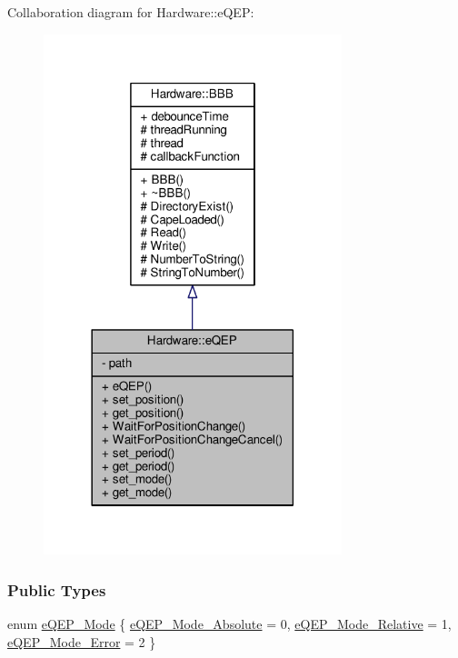 Collaboration diagram for Hardware\+:\+:e\+Q\+E\+P\+:
\nopagebreak
\begin{figure}[H]
\begin{center}
\leavevmode
\includegraphics[width=246pt]{class_hardware_1_1e_q_e_p__coll__graph}
\end{center}
\end{figure}
\subsubsection*{Public Types}
\begin{DoxyCompactItemize}
\item 
enum \hyperlink{class_hardware_1_1e_q_e_p_a3f97f26c64d49d6f2643a257b7249070}{e\+Q\+E\+P\+\_\+\+Mode} \{ \hyperlink{class_hardware_1_1e_q_e_p_a3f97f26c64d49d6f2643a257b7249070a5e916ce9f21af5bd9c5c63609630df7e}{e\+Q\+E\+P\+\_\+\+Mode\+\_\+\+Absolute} = 0, 
\hyperlink{class_hardware_1_1e_q_e_p_a3f97f26c64d49d6f2643a257b7249070a66e4b97a79f9c26d25f2adb99638257e}{e\+Q\+E\+P\+\_\+\+Mode\+\_\+\+Relative} = 1, 
\hyperlink{class_hardware_1_1e_q_e_p_a3f97f26c64d49d6f2643a257b7249070a7456c9de6f190e0267c8e176ed739fad}{e\+Q\+E\+P\+\_\+\+Mode\+\_\+\+Error} = 2
 \}
\end{DoxyCompactItemize}
